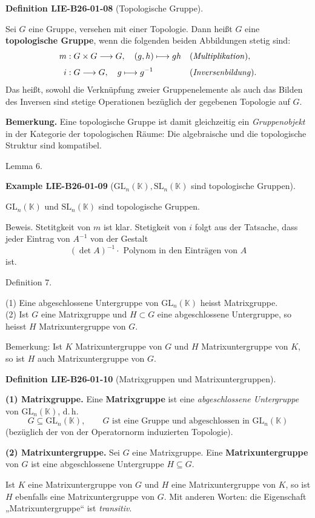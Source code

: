 \documentclass[10pt, letterpaper]{article}
\newcommand{\CustomHeading}[3]{%
  \par\medskip\noindent%
  \textbf{#1 #2} \textnormal{(#3)}.\enskip%
}
\newenvironment{DEF}[2]{\begin{unitbox}\CustomHeading{Definition}{#1}{#2}}{\end{unitbox}}
\newenvironment{EXA}[2]{\begin{unitbox}\CustomHeading{Example}{#1}{#2}}{\end{unitbox}}
\begin{document}
\begin{DEF}{LIE-B26-01-08}{Topologische Gruppe}
Sei $G$ eine Gruppe, versehen mit einer Topologie.  
Dann heißt $G$ eine \textbf{topologische Gruppe}, wenn die folgenden beiden Abbildungen stetig sind:
\begin{align*}
m &: G \times G \longrightarrow G, \quad (g,h) \longmapsto g h 
&& \text{(\textit{Multiplikation})},\\[3pt]
i &: G \longrightarrow G, \quad g \longmapsto g^{-1} 
&& \text{(\textit{Inversenbildung})}.
\end{align*}
Das heißt, sowohl die Verknüpfung zweier Gruppen­elemente als auch das Bilden des Inversen sind stetige Operationen bezüglich der gegebenen Topologie auf $G$.

\textbf{Bemerkung.}  
Eine topologische Gruppe ist damit gleichzeitig ein \textit{Gruppenobjekt} in der Kategorie der topologischen Räume:  
Die algebraische und die topologische Struktur sind kompatibel.
\end{DEF}


Lemma 6. 


\begin{EXA}{LIE-B26-01-09}{$\mathrm{GL}_{n}(\mathbb{K}), \mathrm{SL}_{n}(\mathbb{K})$ sind topologische Gruppen}
$\mathrm{GL}_{n}(\mathbb{K})$ und $\mathrm{SL}_{n}(\mathbb{K})$ sind topologische Gruppen.

Beweis. Stetitgkeit von $m$ ist klar. Stetigkeit von $i$ folgt aus der Tatsache, dass jeder Eintrag von $A^{-1}$ von der Gestalt
$$
(\operatorname{det} A)^{-1} \cdot \text { Polynom in den Einträgen von } A
$$
ist.
\end{EXA}


Definition 7. 

(1) Eine abgeschlossene Untergruppe von $\mathrm{GL}_{n}(\mathbb{K})$ heisst Matrixgruppe.\\
(2) Ist $G$ eine Matrixgruppe und $H \subset G$ eine abgeschlossene Untergruppe, so heisst $H$ Matrixuntergruppe von $G$.

Bemerkung: Ist $K$ Matrixuntergruppe von $G$ und $H$ Matrixuntergruppe von $K$, so ist $H$ auch Matrixuntergruppe von $G$.


\begin{DEF}{LIE-B26-01-10}{Matrixgruppen und Matrixuntergruppen}
\textbf{(1) Matrixgruppe.}  
Eine \textbf{Matrixgruppe} ist eine \emph{abgeschlossene Untergruppe} von $\mathrm{GL}_{n}(\mathbb{K})$, d.\,h.
\[
G \subseteq \mathrm{GL}_{n}(\mathbb{K}), \qquad G \text{ ist eine Gruppe und abgeschlossen in } \mathrm{GL}_{n}(\mathbb{K})
\]
(bezüglich der von der Operatornorm induzierten Topologie).

\textbf{(2) Matrixuntergruppe.}  
Sei $G$ eine Matrixgruppe.  
Eine \textbf{Matrixuntergruppe} von $G$ ist eine abgeschlossene Untergruppe $H \subseteq G$.

Ist $K$ eine Matrixuntergruppe von $G$ und $H$ eine Matrixuntergruppe von $K$,  
so ist $H$ ebenfalls eine Matrixuntergruppe von $G$.  
Mit anderen Worten: die Eigenschaft „Matrixuntergruppe“ ist \emph{transitiv}.
\end{DEF}
\end{document}
